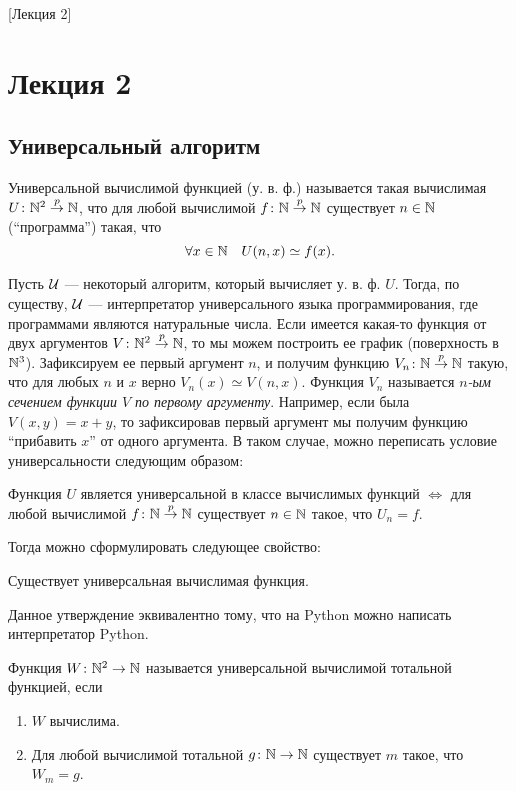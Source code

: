 [Лекция 2]

\section{Лекция 2}

\subsection{Универсальный алгоритм}

\begin{definition}
    Универсальной вычислимой функцией (у. в. ф.) называется такая вычислимая $U \colon \mathbb{N}^{2} \overset{p}{\to} \mathbb{N}$, что для любой вычислимой $f \colon \mathbb{N} \overset{p}{\to} \mathbb{N}$ существует $n \in \mathbb{N}$ (\enquote{программа}) такая, что
    $$
        \forall x \in \mathbb{N} \quad U(n, x) \simeq f(x).
    $$
\end{definition}

Пусть $\mathcal{U}$ --- некоторый алгоритм, который вычисляет у. в. ф. $U$.
Тогда, по существу, $\mathcal{U}$ --- интерпретатор универсального языка программирования, где программами являются натуральные числа.
Если имеется какая-то функция от двух аргументов $V \colon \mathbb{N}^{2} \overset{p}{\to} \mathbb{N}$, то мы можем построить ее график (поверхность в $\mathbb{N}^{3}$).
Зафиксируем ее первый аргумент $n$, и получим функцию $V_{n} \colon \mathbb{N} \overset{p}{\to} \mathbb{N}$ такую, что для любых $n$ и $x$ верно $V_{n}(x) \simeq V(n, x)$.
Функция $V_{n}$ называется {\it $n$-ым сечением функции $V$ по первому аргументу}.
Например, если была $V(x, y) = x + y$, то зафиксировав первый аргумент мы получим функцию \enquote{прибавить $x$} от одного аргумента.
В таком случае, можно переписать условие универсальности следующим образом:
\begin{statement}
    Функция $U$ является универсальной в классе вычислимых функций $\iff$ для любой вычислимой $f \colon \mathbb{N} \overset{p}{\to} \mathbb{N}$ существует $n \in \mathbb{N}$ такое, что $U_{n} = f$.
\end{statement}

Тогда можно сформулировать следующее свойство:
\begin{property}[алгоритмов]
    Существует универсальная вычислимая функция.
\end{property}
Данное утверждение эквивалентно тому, что на Python можно написать интерпретатор Python.

\begin{definition}
    Функция $W \colon \mathbb{N}^{2} \to \mathbb{N}$ называется универсальной вычислимой тотальной функцией, если
    \begin{enumerate}[nosep]
        \item $W$ вычислима.
        \item Для любой вычислимой тотальной $g \colon \mathbb{N} \to \mathbb{N}$ существует $m$ такое, что $W_{m} = g$.
    \end{enumerate}
\end{definition}

